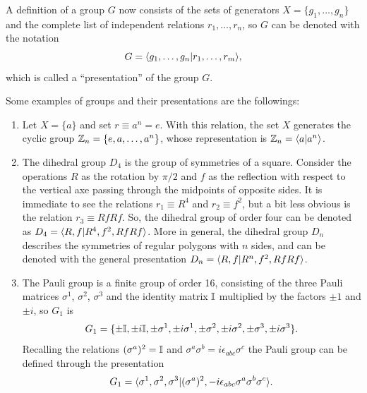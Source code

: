 A definition of a group $G$ now consists of the sets of generators $X = \{g_1,\dots,g_n\}$ and the complete list of independent relations $r_1,\dots,r_n$, so $G$ can be denoted with the notation
\begin{equation}
    G = \langle g_1,\dots,g_n | r_1,\dots,r_m \rangle,
\end{equation}
which is called a ``presentation'' of the group $G$. 
\begin{ex}
    Some examples of groups and their presentations are the followings:
    \begin{enumerate}
        \item Let $X = \{a\}$ and set $r \equiv a^n = e$. With this relation, the set $X$ generates the cyclic group $\mathbb{Z}_n = \{e,a,\dots,a^n\}$, whose representation is $\mathbb{Z}_n = \langle a | a^n \rangle$. 
        \item The dihedral group $D_4$ is the group of symmetries of a square. Consider the operations $R$ as the rotation by $\pi/2$ and $f$ as the reflection with respect to the vertical axe passing through the midpoints of opposite sides. It is immediate to see the relations $r_1 \equiv R^4$ and $r_2 \equiv f^2$, but a bit less obvious is the relation $r_3 \equiv RfRf$. So, the dihedral group of order four can be denoted as $D_4 = \langle R,f | R^4,f^2,RfRf \rangle$. More in general, the dihedral group $D_n$ describes the symmetries of regular polygons with $n$ sides, and can be denoted with the general presentation $D_n = \langle R,f | R^n,f^2,RfRf \rangle$.
        \item The Pauli group is a finite group of order 16, consisting of the three Pauli matrices $\sigma^1$, $\sigma^2$, $\sigma^3$ and the identity matrix $\mathbb{I}$ multiplied by the factors $\pm 1$ and $\pm i$, so $G_1$ is
        \begin{equation}
            G_1 = \{\pm\mathbb{I},\pm i\mathbb{I},\pm\sigma^1,\pm i\sigma^1,\pm\sigma^2,\pm i\sigma^2,\pm\sigma^3,\pm i\sigma^3\}.
        \end{equation}
        Recalling the relations $(\sigma^a)^2 = \mathbb{I}$ and $\sigma^a\sigma^b = i\epsilon_{abc}\sigma^c$ the Pauli group can be defined through the presentation 
        \begin{equation}
            G_1 = \langle \sigma^1,\sigma^2,\sigma^3 | (\sigma^a)^2,-i\epsilon_{abc}\sigma^a\sigma^b\sigma^c \rangle.
        \end{equation}
    \end{enumerate}
\end{ex}

